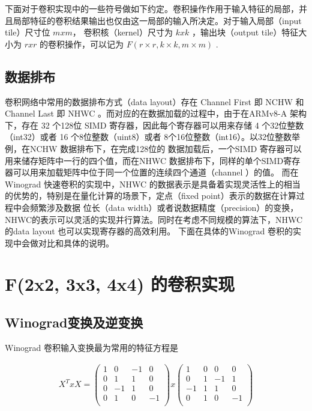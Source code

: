  下面对于卷积实现中的一些符号做如下约定。卷积操作作用于输入特征的局部，并且局部特征的卷积结果输出也仅由这一局部的输入所决定。对于输入局部（input tile）尺寸位 $m x m $，
 卷积核（kernel）尺寸为 $k x k$ ，输出块（output tile）特征大小为 $ r x r $ 的卷积操作，可以记为 $ F(r\times r, k\times k, m\times m) $ .

 \subsection{数据排布}

 卷积网络中常用的数据排布方式（data layout）存在 Channel First 即 NCHW 和 Channel Last 即 NHWC 。而对应的在数据加载的过程中，由于在ARMv8-A 架构下，存在 32 个128位
 SIMD 寄存器，因此每个寄存器可以用来存储 4 个32位整数（int32）或者 16 个8位整数（uint8）或者 8个16位整数（int16）。以32位整数举例，在NCHW 数据排布下，在完成128位的
 数据加载后，一个SIMD 寄存器可以用来储存矩阵中一行的四个值，而在NHWC 数据排布下，同样的单个SIMD寄存器可以用来加载矩阵中位于同一个位置的连续四个通道（channel ）的值。
 而在Winograd 快速卷积的实现中，NHWC 的数据表示是具备着实现灵活性上的相当的优势的，特别是在量化计算的场景下，定点（fixed point）表示的数据在计算过程中会频繁涉及数据
 位长（data width）或者说数据精度（precision）的变换，NHWC的表示可以灵活的实现并行算法。同时在考虑不同规模的算法下，NHWC的data layout 也可以实现寄存器的高效利用。
 下面在具体的Winograd 卷积的实现中会做对比和具体的说明。

\section{F(2x2, 3x3, 4x4) 的卷积实现}

\subsection{Winograd变换及逆变换}

Winograd 卷积输入变换最为常用的特征方程是

\begin{align}
  X^T x X = 
  \begin{pmatrix}
    1 & 0 & -1 & 0 \\
    0 & 1 & 1 & 0 \\
    0 & -1 & 1 & 0 \\
    0 & 1 & 0 & -1 \\
  \end{pmatrix}
  x
  \begin{pmatrix}
    1 & 0 & 0 & 0 \\
    0 & 1 & -1 & 1 \\
    -1 & 1 & 1 & 0 \\
    0 & 1 & 0 & -1 \\
  \end{pmatrix}
\end{align}

